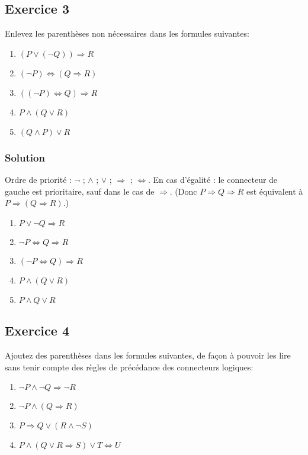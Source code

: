 \subsection*{Exercice 3}
Enlevez les parenthèses non nécessaires dans les formules suivantes:
\begin{enumerate}
	\item $(P \lor (\neg Q)) \Rightarrow R$
	\item $(\neg P) \Leftrightarrow (Q \Rightarrow R)$
	\item $((\neg P) \Leftrightarrow Q) \Rightarrow R$
	\item $P \land (Q \lor R)$
	\item $(Q \land P) \lor R$
\end{enumerate}


\subsubsection*{Solution}
    Ordre de priorité : $\neg$ ; $\land$ ; $\lor$ ; $\Rightarrow$ ; $\Leftrightarrow$.
    En cas d'égalité : le connecteur de gauche est prioritaire, sauf dans le cas de $\Rightarrow$.
    (Donc $P \Rightarrow Q \Rightarrow R$ est équivalent à $P \Rightarrow (Q \Rightarrow R)$.)

    \begin{enumerate}
        \item $P \lor \neg Q \Rightarrow R$
        \item $\neg P \Leftrightarrow Q \Rightarrow R$
        \item $(\neg P \Leftrightarrow Q) \Rightarrow R$
        \item $P \land (Q \lor R)$
        \item $P \land Q \lor R$
    \end{enumerate}

\subsection*{Exercice 4}
Ajoutez des parenthèses dans les formules suivantes, de façon à pouvoir
les lire sans tenir compte des règles de précédance des connecteurs logiques:
\begin{enumerate}
	\item $\neg P \land \neg Q \Rightarrow \neg R$
	\item $\neg P \land (Q \Rightarrow R)$
	\item $P \Rightarrow Q \lor (R \land \neg S)$
	\item $P \land (Q \lor R \Rightarrow S) \lor T \Leftrightarrow U$
\end{enumerate}


